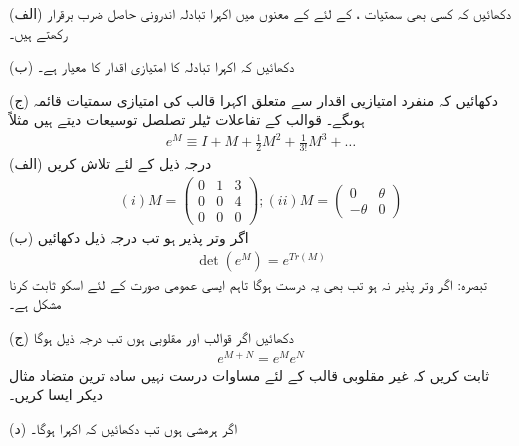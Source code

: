 (الف) دکھائیں کہ کسی بھی سمتیات ،  کے لئے  کے معنوں میں  اکہرا تبادلہ اندرونی حاصل ضرب برقرار رکھتے ہیں۔

(ب) دکھائیں کہ اکہرا تبادلہ کا امتیازی اقدار کا معیار  ہے۔

(ج) دکھائیں کہ منفرد امتیازیی اقدار سے متعلق اکہرا قالب کی امتیازی سمتیات قائمہ ہوںگے۔
قوالب کے تفاعلات ٹیلر تصلصل توسیعات دیتے ہیں مثلاً 
\begin{align}
	e^M\equiv I + M +\frac{1}{2}M^2 + \frac{1}{3!}M^3 + \dots
\end{align}
(الف) درجہ ذیل کے لئے  تلاش کریں
\begin{align*}
	(i) M=
	\begin{pmatrix}
		0 & 1 & 3\\
		0 & 0 & 4\\
		0 & 0 & 0
	\end{pmatrix}
		; (ii) M=
	\begin{pmatrix}
		0 & \theta\\
		-\theta & 0
	\end{pmatrix}
\end{align*}
(ب) اگر  وتر پذیر  ہو تب درجہ ذیل دکھائیں
\begin{align}
	\det\left(e^M\right) = e^{Tr(M)}
\end{align}
تبصرہ: اگر  وتر پذیر نہ ہو تب بھی یہ درست ہوگا تاہم ایسی عمومی صورت کے لئے اسکو ثابت کرنا مشکل ہے۔

(ج) دکھائیں اگر قوالب  اور  مقلوبی ہوں تب درجہ ذیل ہوگا
\begin{align}
	e^{M+N} = e^Me^N
\end{align}
ثابت کریں کہ غیر مقلوبی قالب کے لئے مساوات  درست نہیں سادہ ترین متضاد مثال دیکر ایسا کریں۔

(د) اگر  ہرمشی ہوں تب دکھائیں کہ اکہرا ہوگا۔
